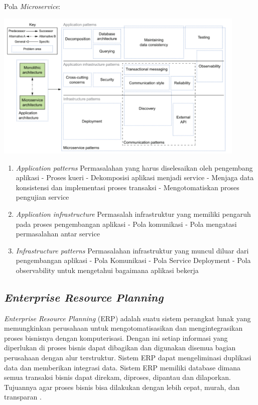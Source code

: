 Pola \textit{Microservice}:
\begin{center}
	\includegraphics[width=12cm]{img/PolaMicroservice.png}
	\label{fig:msa}
\end{center}
\begin{enumerate}[leftmargin=1.3cm]
	\item \textit{Application patterns}
	Permasalahan yang harus diselesaikan oleh pengembang aplikasi
	- Proses kueri
	- Dekomposisi aplikasi menjadi service
	- Menjaga data konsistensi dan implementasi proses transaksi
	- Mengotomatiskan proses pengujian  service
	\item \textit{Application infrastructure} 
	Permasalah infrastruktur yang memiliki pengaruh pada proses pengembangan aplikasi
	- Pola komunikasi
	- Pola mengatasi permasalahan antar service
	\item \textit{Infrastructure patterns} 
	Permasalahan infrastruktur yang muncul diluar dari pengembangan aplikasi
	- Pola Komunikasi
	- Pola Service Deployment
	- Pola observability untuk mengetahui bagaimana aplikasi bekerja\\	
\end{enumerate}	

\subsection{\textit{Enterprise Resource Planning}}
\textit{Enterprise Resource Planning} (ERP) adalah suatu sistem perangkat lunak yang memungkinkan perusahaan untuk mengotomatisasikan dan mengintegrasikan proses bisnisnya dengan komputerisasi. Dengan ini setiap informasi yang diperlukan di proses bisnis dapat dibagikan dan digunakan disemua bagian perusahaan dengan alur terstruktur. Sistem ERP dapat mengeliminasi duplikasi data dan memberikan integrasi data. Sistem ERP memiliki database dimana semua transaksi bisnis dapat direkam, diproses, dipantau dan dilaporkan. Tujuannya agar proses bisnis bisa dilakukan dengan lebih cepat, murah, dan transparan \cite{1}.

